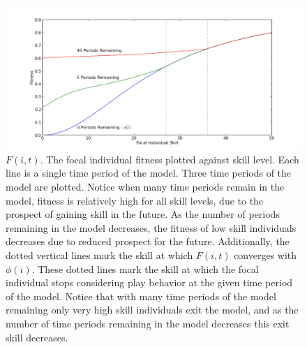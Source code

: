 \documentclass[12pt, letterpaper, fleqn]{article}
\begin{document}
	\clearpage
	\begin{figure}[h!]
	\begin{center}
	\caption{$F(i,t)$. The focal individual fitness plotted against skill level. Each line is a single time period of the model. Three time periods of the model are plotted. Notice when many time periods remain in the model, fitness is relatively high for all skill levels, due to the prospect of gaining skill in the future. As the number of periods remaining in the model decreases, the fitness of low skill individuals decreases due to reduced prospect for the future. Additionally, the dotted vertical lines mark the skill at which $F(i,t)$ converges with $\phi(i)$. These dotted lines mark the skill at which the focal individual stops considering play behavior at the given time period of the model. Notice that with many time periods of the model remaining only very high skill individuals exit the model, and as the number of time periods remaining in the model decreases this exit skill decreases.  }
	\centerline{\includegraphics[width=160mm]{fitness.pdf}}
	\end{center}
	\label{fit}
	\end{figure}
	
\end{document}
